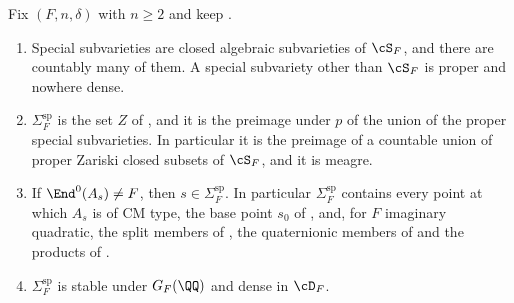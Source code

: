 \begin{proposition}\label{prop:speciallocus}
Fix $(F,n,\delta)$ with $n\ge2$ and keep .
\begin{enumerate}[label=\textup{(\roman*)},leftmargin=2.6em,itemsep=2pt]
\item Special subvarieties are closed algebraic subvarieties of $\cS_{F}$, and
  there are countably many of them. A special subvariety other than
  $\cS_{F}$ is proper and nowhere dense.
\item $\Sigma^{\mathrm{sp}}_{F}$ is the set $Z$ of , and
  it is the preimage under $p$ of the union of the proper special
  subvarieties. In particular it is the preimage of a countable union of
  proper Zariski closed subsets of $\cS_{F}$, and it is meagre.
\item If $\End^{0}(A_{s})\ne F$, then $s\in\Sigma^{\mathrm{sp}}_{F}$. In
  particular $\Sigma^{\mathrm{sp}}_{F}$ contains every point at which $A_{s}$
  is of CM type, the base point $s_{0}$ of , and, for
  $F$ imaginary quadratic, the split members of , the
  quaternionic members of  and the products of
  .
\item $\Sigma^{\mathrm{sp}}_{F}$ is stable under $G_{F}(\QQ)$ and dense in
  $\cD_{F}$.
\end{enumerate}
\end{proposition}

